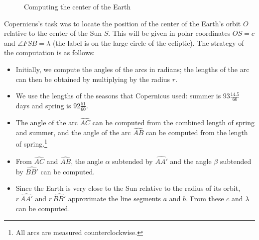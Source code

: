 \begin{figure}[t]
\begin{center}
\caption{Computing the center of the Earth}\label{f.seasons-details}
\end{center}
\end{figure}

Copernicus's task was to locate the position of the center of the Earth's orbit $O$ relative to the center of the Sun $S$. This will be given in polar coordinates $OS=c$ and $\angle FSB = \lambda$ (the label is on the large circle of the ecliptic). The strategy of the computation is as follows:
\begin{itemize}
\item Initially, we compute the angles of the arcs in radians; the lengths of the arc can then be obtained by multiplying by the radius $r$.
\item We use the lengths of the seasons that Copernicus used: summer is $93\frac{14.5}{60}$ days and spring is $92\frac{51}{60}$.
\item The angle of the arc $\widehat{AC}$ can be computed from the combined length of spring and summer, and the angle of the arc $\widehat{AB}$ can be computed from the length of spring.\footnote{All arcs are measured counterclockwise.}
\item From $\widehat{AC}$ and $\widehat{AB}$, the angle $\alpha$ subtended by $\widehat{AA'}$ and the angle $\beta$ subtended by $\widehat{BB'}$ can be computed.
\item Since the Earth is very close to the Sun relative to the radius of its orbit, $r\,\widehat{AA'}$ and $r\,\widehat{BB'}$ approximate the line segments $a$ and $b$. From these $c$ and $\lambda$ can be computed.
\end{itemize}

